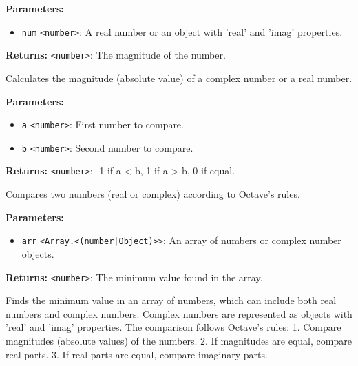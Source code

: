 \documentclass[12pt,a4paper]{article}
\begin{document}
\noindent \textbf{Parameters:}
\begin{itemize}
  \item \texttt{num} \texttt{<number>}: A real number or an object with 'real' and 'imag' properties.
\end{itemize}

\noindent \textbf{Returns:} \texttt{<number>}: The magnitude of the number.

\noindent Calculates the magnitude (absolute value) of a complex number or a real number.

\vspace{5mm}
\noindent {}


\noindent \textbf{Parameters:}
\begin{itemize}
  \item \texttt{a} \texttt{<number>}: First number to compare.
  \item \texttt{b} \texttt{<number>}: Second number to compare.
\end{itemize}

\noindent \textbf{Returns:} \texttt{<number>}: -1 if a < b, 1 if a > b, 0 if equal.

\noindent Compares two numbers (real or complex) according to Octave's rules.

\vspace{5mm}
\noindent {}


\noindent \textbf{Parameters:}
\begin{itemize}
  \item \texttt{arr} \texttt{<Array.<(number|Object)>>}: An array of numbers or complex number objects.
\end{itemize}

\noindent \textbf{Returns:} \texttt{<number>}: The minimum value found in the array.

\noindent Finds the minimum value in an array of numbers, which can include both real numbers and complex numbers.
Complex numbers are represented as objects with 'real' and 'imag' properties.
The comparison follows Octave's rules:
1. Compare magnitudes (absolute values) of the numbers.
2. If magnitudes are equal, compare real parts.
3. If real parts are equal, compare imaginary parts.
\end{document}
